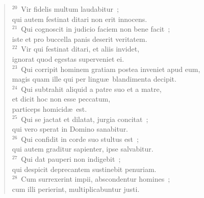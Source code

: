 \begin{flushleft}\begin{verse}${}^{20}$~Vir fidelis multum laudabitur~;\\ qui autem festinat ditari non erit innocens.\\
${}^{21}$~Qui cognoscit in judicio faciem non bene facit~;\\ iste et pro buccella panis deserit veritatem.\\
${}^{22}$~Vir qui festinat ditari, et aliis invidet,\\ ignorat quod egestas superveniet ei.\\
${}^{23}$~Qui corripit hominem gratiam postea inveniet apud eum,\\ magis quam ille qui per lingu\ae\ blandimenta decipit.\\
${}^{24}$~Qui subtrahit aliquid a patre suo et a matre,\\ et dicit hoc non esse peccatum,\\ particeps homicid\ae\ est.\\
${}^{25}$~Qui se jactat et dilatat, jurgia concitat~;\\ qui vero sperat in Domino sanabitur.\\
${}^{26}$~Qui confidit in corde suo stultus est~;\\ qui autem graditur sapienter, ipse salvabitur.\\
${}^{27}$~Qui dat pauperi non indigebit~;\\ qui despicit deprecantem sustinebit penuriam.\\
${}^{28}$~Cum surrexerint impii, abscondentur homines~;\\ cum illi perierint, multiplicabuntur justi.\end{verse}\end{flushleft}


